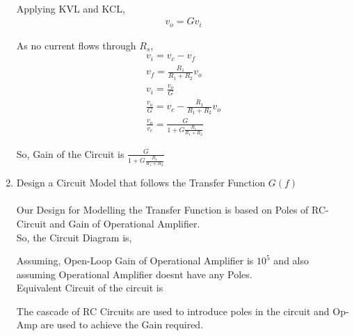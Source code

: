 \begin{enumerate}[label=\thesection.\arabic*.,ref=\thesection.\theenumi]
\solution\\
Applying KVL and KCL,
\begin{align}
v_{o} = Gv_{i}
\end{align}

As no current flows through $R_{s}$,
\begin{align}
v_{i} = v_{c} - v_{f}\\
v_{f} = \frac{R_{1}}{R_{1}+R_{2}}v_{o}\\
v_{i} = \frac{v_{o}}{G}\\
\frac{v_{o}}{G} = v_{c} - \frac{R_{1}}{R_{1}+R_{2}}v_{o}\\
\frac{v_{o}}{v_{c}} = \frac{G}{1+G\frac{R_{1}}{R_{1}+R_{2}}}
\end{align}

So, Gain of the Circuit is $\frac{G}{1+G\frac{R_{1}}{R_{1}+R_{2}}}$
\item Design a Circuit Model that follows the Transfer Function $G(f)$\\
\solution\\
Our Design for Modelling the Transfer Function is based on Poles of RC-Circuit and Gain of Operational Amplifier.\\

So, the Circuit Diagram is,
\begin{figure}[ht!]
	\begin{center}
		\resizebox{\columnwidth/1}{!}{}
	\end{center}
	\caption{}
	\label{fig:ee18btech11014_Open-Loop Circuit}
\end{figure}
 
Assuming, Open-Loop Gain of Operational Amplifier is $10^{5}$ and also assuming Operational Amplifier doesnt have any Poles.\\
Equivalent Circuit of the circuit is
\begin{figure}[ht!]
	\begin{center}
		\resizebox{\columnwidth/1}{!}{}
	\end{center}
	\caption{}
	\label{fig:ee18btech11014_Equivalent Open-Loop Circuit}
\end{figure}

The cascade of RC Circuits are used to introduce poles in the circuit and Op-Amp are used to achieve the Gain required.\\


\end{enumerate}
